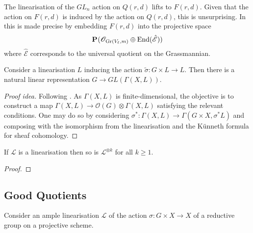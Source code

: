 \documentclass[12pt]{ociamthesis}  %
\begin{document}
\begin{example}
  The linearisation of the $GL_n$ action on $Q(r,d)$ lifts to
  $F(r,d)$. Given that the action on $F(r,d)$ is induced by the
  action on $Q(r,d)$, this is unsurprising. In \cite{nitsure1991}
  this is made precise by embedding $F(r,d)$ into the projective
  space
  \begin{align*}
    \mathbf{P}^{}_{}(\mathscr O_{\text{Gr}(V_\ell,m)}\oplus\operatorname{End}(\hat{\mathscr E}))
  \end{align*}
  where $\hat{\mathscr E}$ corresponds to the universal quotient
  on the Grassmannian.
  \missingexample
\end{example}

\begin{lemma}\label{lem:linearisations_give_reps}
  Consider a linearisation $L$ inducing the action
  $\tilde\sigma : G\times L\to L$.
  Then there is a natural linear representation $G\to GL(\Gamma(X,L))$.
  \begin{proof}[Proof idea]
    Following \cite[Lemma 5.19]{hoskins2016}. As $\Gamma(X,L)$
    is finite-dimensional, the objective is to construct a map
    $\Gamma(X,L) \to \mathscr O(G) \otimes \Gamma(X,L)$
    satisfying the relevant conditions. One may do so by considering
    $\sigma^* : \Gamma(X,L) \to \Gamma(G\times X,\sigma^*L)$ and
    composing with the isomorphism from the linearisation and
    the K\"unneth formula for sheaf cohomology.
  \end{proof}
\end{lemma}

\begin{lemma}
  If $\mathscr L$ is a linearisation then so is $\mathscr L^{\otimes k}$
  for all $k\geq 1$.
  \begin{proof}
    \missingproof
  \end{proof}
\end{lemma}

\subsection{Good Quotients}

Consider an ample linearisation $\mathscr L$ of the action $\sigma : G\times X\to X$
of a reductive group on a projective scheme.
\end{document}

